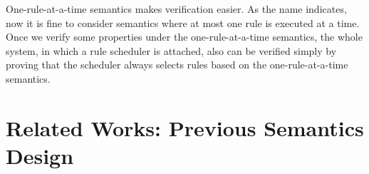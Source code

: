 One-rule-at-a-time semantics makes verification easier. As the name
indicates, now it is fine to consider semantics where at most one rule
is executed at a time. Once we verify some properties under the
one-rule-at-a-time semantics, the whole system, in which a rule
scheduler is attached, also can be verified simply by proving that the
scheduler always selects rules based on the one-rule-at-a-time
semantics.

\section{Related Works: Previous Semantics Design}
\label{sec:related-works}




